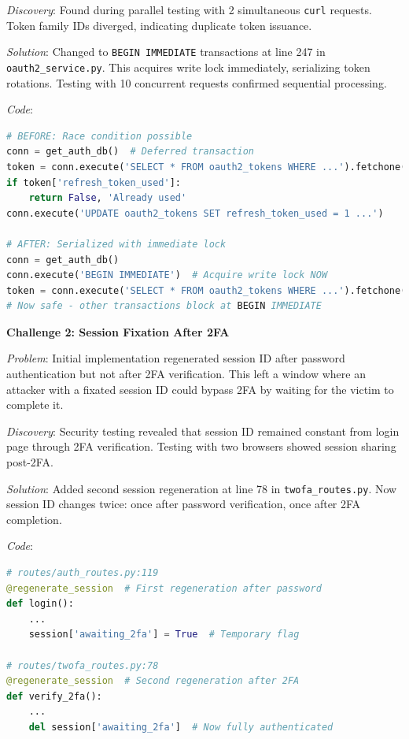 \documentclass[12pt,a4paper]{article}
\begin{document}
\textit{Discovery}: Found during parallel testing with 2 simultaneous \texttt{curl} requests. Token family IDs diverged, indicating duplicate token issuance.

\textit{Solution}: Changed to \texttt{BEGIN IMMEDIATE} transactions at line 247 in \texttt{oauth2\_service.py}. This acquires write lock immediately, serializing token rotations. Testing with 10 concurrent requests confirmed sequential processing.

\textit{Code}:
\begin{lstlisting}[language=Python]
# BEFORE: Race condition possible
conn = get_auth_db()  # Deferred transaction
token = conn.execute('SELECT * FROM oauth2_tokens WHERE ...').fetchone()
if token['refresh_token_used']:
    return False, 'Already used'
conn.execute('UPDATE oauth2_tokens SET refresh_token_used = 1 ...')

# AFTER: Serialized with immediate lock
conn = get_auth_db()
conn.execute('BEGIN IMMEDIATE')  # Acquire write lock NOW
token = conn.execute('SELECT * FROM oauth2_tokens WHERE ...').fetchone()
# Now safe - other transactions block at BEGIN IMMEDIATE
\end{lstlisting}

\textbf{Challenge 2: Session Fixation After 2FA}

\textit{Problem}: Initial implementation regenerated session ID after password authentication but not after 2FA verification. This left a window where an attacker with a fixated session ID could bypass 2FA by waiting for the victim to complete it.

\textit{Discovery}: Security testing revealed that session ID remained constant from login page through 2FA verification. Testing with two browsers showed session sharing post-2FA.

\textit{Solution}: Added second session regeneration at line 78 in \texttt{twofa\_routes.py}. Now session ID changes twice: once after password verification, once after 2FA completion.

\textit{Code}:
\begin{lstlisting}[language=Python]
# routes/auth_routes.py:119
@regenerate_session  # First regeneration after password
def login():
    ...
    session['awaiting_2fa'] = True  # Temporary flag

# routes/twofa_routes.py:78
@regenerate_session  # Second regeneration after 2FA
def verify_2fa():
    ...
    del session['awaiting_2fa']  # Now fully authenticated
\end{lstlisting}
\end{document}
